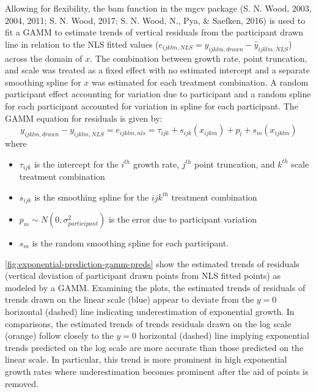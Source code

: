 \documentclass[print]{nuthesis}
\providecommand{\tightlist}{%
  \setlength{\itemsep}{0pt}\setlength{\parskip}{0pt}}
\begin{document}
Allowing for flexibility, the bam function in the mgcv package (S. N. Wood, 2003, 2004, 2011; S. N. Wood, 2017; S. N. Wood, N., Pya, \& Saefken, 2016) is used to fit a GAMM to estimate trends of vertical residuals from the participant drawn line in relation to the NLS fitted values (\(e_{ijklm,NLS} = y_{ijklm,drawn} - \hat y_{ijklm,NLS}\)) across the domain of \(x\).
The combination between growth rate, point truncation, and scale was treated as a fixed effect with no estimated intercept and a separate smoothing spline for \(x\) was estimated for each treatment combination.
A random participant effect accounting for variation due to participant and a random spline for each participant accounted for variation in spline for each participant.
The GAMM equation for residuals is given by:
\begin{equation}
y_{ijklm,drawn} - y_{ijklm,NLS} = e_{ijklm,nls} = \tau_{ijk} + s_{ijk}(x_{ijkm}) + p_{l} + s_{m}(x_{ijklm})
\end{equation}
\noindent where

\begin{itemize}
\tightlist
\item
  \(\tau_{ijk}\) is the intercept for the \(i^{th}\) growth rate, \(j^{th}\) point truncation, and \(k^{th}\) scale treatment combination
\item
  \(s_{ijk}\) is the smoothing spline for the \(ijk^{th}\) treatment combination
\item
  \(p_{m} \sim N(0, \sigma^2_{participant})\) is the error due to participant variation
\item
  \(s_{m}\) is the random smoothing spline for each participant.
\end{itemize}

\cref{fig:exponential-prediction-gamm-preds} show the estimated trends of residuals (vertical deviation of participant drawn points from NLS fitted points) as modeled by a GAMM.
Examining the plots, the estimated trends of residuals of trends drawn on the linear scale (blue) appear to deviate from the \(y=0\) horizontal (dashed) line indicating underestimation of exponential growth.
In comparisons, the estimated trends of trends residuals drawn on the log scale (orange) follow closely to the \(y=0\) horizontal (dashed) line implying exponential trends predicted on the log scale are more accurate than those predicted on the linear scale.
In particular, this trend is more prominent in high exponential growth rates where underestimation becomes prominent after the aid of points is removed.
\end{document}
